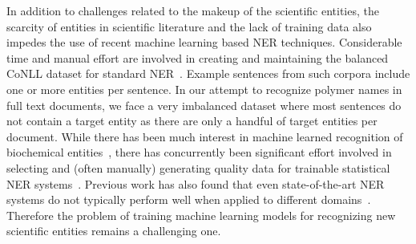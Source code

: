 In addition to challenges related to the makeup of the scientific entities, the scarcity of entities in scientific literature and the lack of training data also impedes the use of recent machine learning based NER techniques.
Considerable time and manual effort are involved in creating and maintaining the balanced
CoNLL dataset for standard NER~\cite{tjong2003introduction}.
Example sentences from such corpora include one or more entities per sentence. 
In our attempt to recognize polymer names in full text documents, we face a very imbalanced dataset where most sentences do not contain a target entity as there are only a handful of target entities per document.
While there has been much interest in machine learned recognition of biochemical entities~\cite{jessop2011oscar4,rocktaschel2012chemspot,leaman2015tmchem,swain2016chemdataextractor}, there has concurrently been significant effort involved in selecting and (often manually) generating quality data for
trainable statistical NER systems~\cite{krallinger2015chemdner}. 
Previous work has also found that even state-of-the-art NER systems do
not typically perform well when applied to different domains~\cite{krallinger2013overview}. 
Therefore the problem of training machine learning models for recognizing new scientific entities remains a challenging one.

